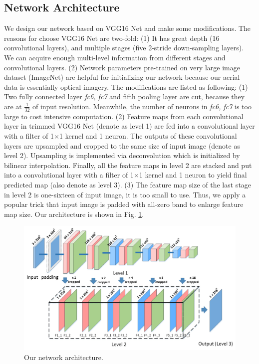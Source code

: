 \documentclass[runningheads]{llncs}
\begin{document}
\subsection{Network Architecture} 
   We design our network based on VGG16 Net \cite{Simonyan2014Very} and make some modifications. The reasons for choose VGG16 Net are two-fold: (1) It has great depth (16 convolutional layers), and multiple stages (five 2-stride down-sampling layers). We can acquire enough multi-level information from different stages and convolutional layers. (2) Network parameters pre-trained on very large image dataset (ImageNet) are helpful for initializing our network  because our aerial data is essentially optical imagery.  The modifications are listed as following: (1) Two fully connected layer \textit{fc6, fc7} and fifth pooling layer are cut, because they are at $\frac{1}{32}$ of input resolution. Meanwhile, the number of neurons in \textit{fc6, fc7} is too large to cost intensive computation. (2) Feature maps from each convolutional layer in trimmed VGG16 Net (denote as level 1) are fed into a convolutional layer with a filter of 1$\times$1 kernel and 1 neuron. The outputs of these convolutional layers are upsampled and cropped to the same size of input image (denote as level 2). Upsampling is implemented via deconvolution which is initialized by bilinear interpolation.  Finally, all the  feature maps in level 2 are stacked and put into a convolutional layer with a filter of 1$\times$1 kernel and 1 neuron to yield final predicted map (also denote as level 3). (3) The  feature map size of the last stage in level 2 is one-sixteen of input image, it is too small to use. Thus, we apply a popular trick that input image is padded with all-zero band to enlarge feature map size. Our architecture is shown in Fig. \ref{fig:hierarchicalFCN}.
 
\begin{figure}
\centering
\includegraphics[width=120mm]{hierarchicalFCN5}
\caption{Our network architecture.}
\label{fig:hierarchicalFCN}
\end{figure}
\end{document}

